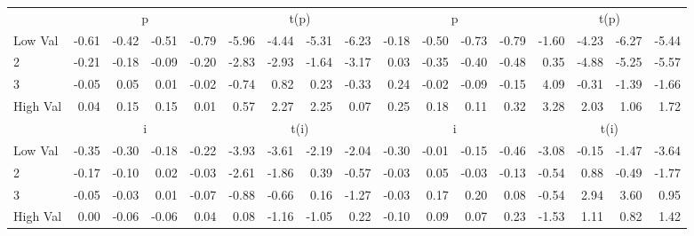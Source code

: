 \begin{table}[!ht]
\begin{tabular}{lrrrrrrrrrrrrrrrr}
  
    
      & \multicolumn{4}{c}{p} & \multicolumn{4}{c}{t(p)}
    
      & \multicolumn{4}{c}{p} & \multicolumn{4}{c}{t(p)}
    
    \\
      \cmidrule(r){2-5} \cmidrule(r){6-9} \cmidrule(r){10-13} \cmidrule(r){14-17}

    Low Val   & -0.61  & -0.42  & -0.51  & -0.79  & -5.96  & -4.44  & -5.31  & -6.23  & -0.18  & -0.50  & -0.73  & -0.79  & -1.60  & -4.23  & -6.27  & -5.44  \\
           2  & -0.21  & -0.18  & -0.09  & -0.20  & -2.83  & -2.93  & -1.64  & -3.17  & 0.03  & -0.35  & -0.40  & -0.48  & 0.35  & -4.88  & -5.25  & -5.57  \\
           3  & -0.05  & 0.05  & 0.01  & -0.02  & -0.74  & 0.82  & 0.23  & -0.33  & 0.24  & -0.02  & -0.09  & -0.15  & 4.09  & -0.31  & -1.39  & -1.66  \\
    High Val  & 0.04  & 0.15  & 0.15  & 0.01  & 0.57  & 2.27  & 2.25  & 0.07  & 0.25  & 0.18  & 0.11  & 0.32  & 3.28  & 2.03  & 1.06  & 1.72  \\

  
    
      & \multicolumn{4}{c}{i} & \multicolumn{4}{c}{t(i)}
    
      & \multicolumn{4}{c}{i} & \multicolumn{4}{c}{t(i)}
    
    \\
      \cmidrule(r){2-5} \cmidrule(r){6-9} \cmidrule(r){10-13} \cmidrule(r){14-17}

    Low Val   & -0.35  & -0.30  & -0.18  & -0.22  & -3.93  & -3.61  & -2.19  & -2.04  & -0.30  & -0.01  & -0.15  & -0.46  & -3.08  & -0.15  & -1.47  & -3.64  \\
           2  & -0.17  & -0.10  & 0.02  & -0.03  & -2.61  & -1.86  & 0.39  & -0.57  & -0.03  & 0.05  & -0.03  & -0.13  & -0.54  & 0.88  & -0.49  & -1.77  \\
           3  & -0.05  & -0.03  & 0.01  & -0.07  & -0.88  & -0.66  & 0.16  & -1.27  & -0.03  & 0.17  & 0.20  & 0.08  & -0.54  & 2.94  & 3.60  & 0.95  \\
    High Val  & 0.00  & -0.06  & -0.06  & 0.04  & 0.08  & -1.16  & -1.05  & 0.22  & -0.10  & 0.09  & 0.07  & 0.23  & -1.53  & 1.11  & 0.82  & 1.42  \\

  

  \bottomrule
\end{tabular}
\label{tbl:32_Size_BM_Prior_FF2016}
\end{table}